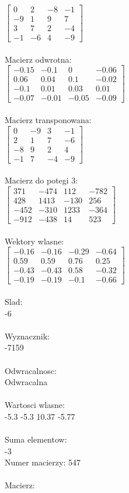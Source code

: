 \documentclass[a4paper,12pt]{article}
\begin{document}
$\begin{bmatrix} 0&2&-8&-1\\-9&1&9&7\\3&7&2&-4\\-1&-6&4&-9 \end{bmatrix}$
\\
\\
Macierz odwrotna:\\

$\begin{bmatrix} -0.15&-0.1&0&-0.06\\0.06&0.04&0.1&-0.02\\-0.1&0.01&0.03&0.01\\-0.07&-0.01&-0.05&-0.09 \end{bmatrix}$
\\
\\
Macierz transponowana:\\

$\begin{bmatrix} 0&-9&3&-1\\2&1&7&-6\\-8&9&2&4\\-1&7&-4&-9 \end{bmatrix}$
\\
\\
Macierz do potegi 3:\\

$\begin{bmatrix} 371&-474&112&-782\\428&1413&-130&256\\-452&-310&1233&-364\\-912&-438&14&523 \end{bmatrix}$
\\
\\
Wektory wlasne:\\

$\begin{bmatrix} -0.16&-0.16&-0.29&-0.64\\0.59&0.59&0.76&0.25\\-0.43&-0.43&0.58&-0.32\\-0.19&-0.19&-0.1&-0.66 \end{bmatrix}$
\\
\\
Slad:\\
-6
\\
\\
Wyznacznik:\\
-7159
\\
\\
Odwracalnosc:\\
Odwracalna
\\
\\
Wartosci wlasne:\\
-5.3 -5.3 10.37 -5.77
\\
\\
Suma elementow:\\
-3
\\
\newpage
Numer macierzy:
547
\\
\\
Macierz:\\
\end{document}
